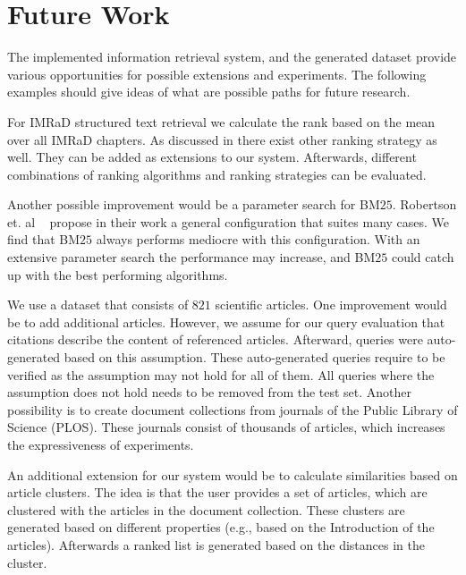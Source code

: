 \section{Future Work}
\label{sec:future_work}

The implemented information retrieval system, and the generated dataset provide various opportunities for possible extensions and experiments. The following examples should give ideas of what are possible paths for future research.

For IMRaD structured text retrieval we calculate the rank based on the mean over all IMRaD chapters. As discussed in  there exist other ranking strategy as well. They can be added as extensions to our system. Afterwards, different combinations of ranking algorithms and ranking strategies can be evaluated. 

Another possible improvement would be a parameter search for BM$25$. Robertson et. al ~\cite{RobertsonWJHG94} propose in their work a general configuration that suites many cases. We find that BM$25$ always performs mediocre with this configuration. With an extensive parameter search the performance may increase, and BM$25$ could catch up with the best performing algorithms.

We use a dataset that consists of $821$ scientific articles. One improvement would be to add additional articles. However, we assume for our query evaluation that citations describe the content of referenced articles. Afterward, queries were auto-generated based on this assumption. These auto-generated queries require to be verified as the assumption may not hold for all of them. All queries where the assumption does not hold needs to be removed from the test set. Another possibility is to create document collections from journals of the Public Library of Science (PLOS). These journals consist of thousands of articles, which increases the expressiveness of experiments.

An additional extension for our system would be to calculate similarities based on article clusters. The idea is that the user provides a set of articles, which are clustered with the articles in the document collection. These clusters are generated based on different properties (e.g., based on the Introduction of the articles). Afterwards a ranked list is generated based on the distances in the cluster.

